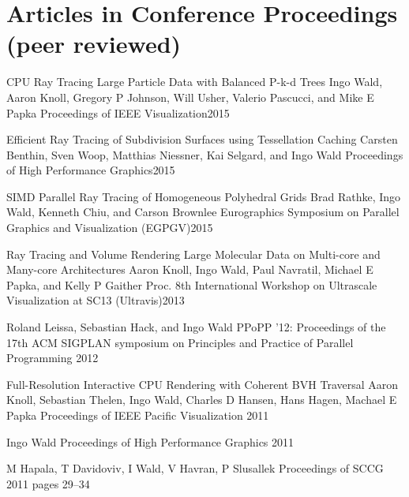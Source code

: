 \documentclass[letterpaper,11pt]{moderncv}
\begin{document}
\medskip
\section{Articles in Conference Proceedings  (peer reviewed)}


  \cvbibitem 
    {CPU Ray Tracing Large Particle Data with Balanced P-k-d Trees}
    {Ingo Wald, Aaron Knoll, Gregory P Johnson, Will Usher, Valerio Pascucci, and Mike E Papka}
    {Proceedings of IEEE Visualization}{2015}

  \cvbibitem 
    {Efficient Ray Tracing of Subdivision Surfaces using Tessellation Caching}
    {Carsten Benthin, Sven Woop, Matthias Niessner, Kai Selgard, and Ingo Wald}
    {Proceedings of High Performance Graphics}{2015}

  \cvbibitem 
    {SIMD Parallel Ray Tracing of Homogeneous Polyhedral Grids}
    {Brad Rathke, Ingo Wald, Kenneth Chiu, and Carson Brownlee}
    {Eurographics Symposium on Parallel Graphics and Visualization (EGPGV)}{2015}

  \cvbibitem 
    {Ray Tracing and Volume Rendering Large Molecular Data on Multi-core and Many-core Architectures}
    {Aaron Knoll, Ingo Wald, Paul Navratil, Michael E Papka, and Kelly P Gaither}
    {Proc. 8th International Workshop on Ultrascale Visualization at SC13 (Ultravis)}{2013}

{Roland Leissa, Sebastian Hack, and Ingo Wald}
{PPoPP '12: Proceedings of the 17th ACM SIGPLAN symposium on Principles and Practice of Parallel Programming 2012}
{}

\cvbibitem
{Full-Resolution Interactive CPU Rendering
with Coherent BVH Traversal}
{
Aaron Knoll, 
Sebastian Thelen,
Ingo Wald,
Charles D Hansen,
Hans Hagen,
Machael E Papka}
{Proceedings of IEEE Pacific Visualization 2011}
{}

{Ingo Wald}
{Proceedings of High Performance Graphics 2011}
{}

{M Hapala, T Davidoviv, I Wald, V Havran, P Slusallek}
{Proceedings of SCCG 2011}
{pages 29--34}
\end{document}
